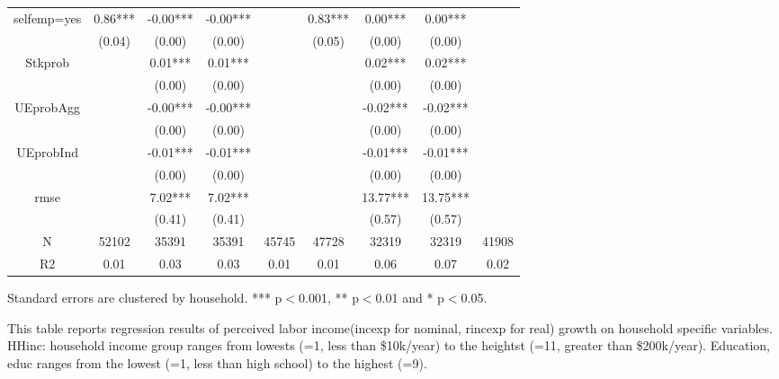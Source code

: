 \documentclass[12pt,notitlepage,onecolumn,aps,pra]{article}
\begin{document}
\begin{table}[p]
\begin{adjustbox}{width={\textwidth}}
\begin{threeparttable}
\begin{tabular}{ccccccccc}
selfemp=yes      &   0.86*** &  -0.00*** &   -0.00*** &             &   0.83*** &    0.00*** &     0.00*** &              \\
                 &    (0.04) &    (0.00) &     (0.00) &             &    (0.05) &     (0.00) &      (0.00) &              \\
Stkprob          &           &   0.01*** &    0.01*** &             &           &    0.02*** &     0.02*** &              \\
                 &           &    (0.00) &     (0.00) &             &           &     (0.00) &      (0.00) &              \\
UEprobAgg        &           &  -0.00*** &   -0.00*** &             &           &   -0.02*** &    -0.02*** &              \\
                 &           &    (0.00) &     (0.00) &             &           &     (0.00) &      (0.00) &              \\
UEprobInd        &           &  -0.01*** &   -0.01*** &             &           &   -0.01*** &    -0.01*** &              \\
                 &           &    (0.00) &     (0.00) &             &           &     (0.00) &      (0.00) &              \\
rmse             &           &   7.02*** &    7.02*** &             &           &   13.77*** &    13.75*** &              \\
                 &           &    (0.41) &     (0.41) &             &           &     (0.57) &      (0.57) &              \\
N                &     52102 &     35391 &      35391 &       45745 &     47728 &      32319 &       32319 &        41908 \\
R2               &      0.01 &      0.03 &       0.03 &        0.01 &      0.01 &       0.06 &        0.07 &         0.02 \\
\bottomrule
\end{tabular}
\begin{tablenotes}\item Standard errors are clustered by household. *** p$<$0.001, ** p$<$0.01 and * p$<$0.05. 
\item This table reports regression results of perceived labor income(incexp for nominal, rincexp for real) growth on household specific variables. HHinc: household income group ranges from lowests (=1, less than \$10k/year) to the heightst (=11, greater than \$200k/year). Education, educ ranges from the lowest (=1, less than high school) to the highest (=9).
\end{tablenotes}
\end{threeparttable}
\end{adjustbox}
\end{table}
\end{document}
